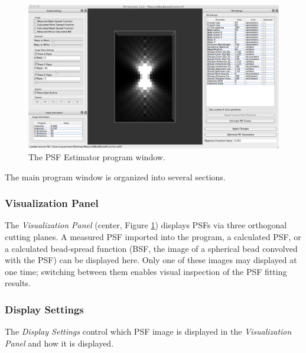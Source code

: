 \documentclass[11pt,titlepage,twoside]{article}
\begin{document}
\begin{figure}[h]
  \centering
  \includegraphics[scale=0.3]{images/ProgramWindow}
  \caption{The PSF Estimator program window.}
  \label{fig:ProgramWindow}
\end{figure}

The main program window is organized into several sections. 

\subsubsection{Visualization Panel}

The \emph{Visualization Panel} (center, Figure \ref{fig:ProgramWindow}) displays PSFs via three orthogonal cutting planes. A measured PSF imported into the program, a calculated PSF, or a calculated bead-spread function (BSF, the image of a spherical bead convolved with the PSF) can be displayed here. Only one of these images may displayed at one time; switching between them enables visual inspection of the PSF fitting results.

\subsubsection{Display Settings}

The \emph{Display Settings} control which PSF image is displayed in the \emph{Visualization Panel} and how it is displayed.
\end{document}
